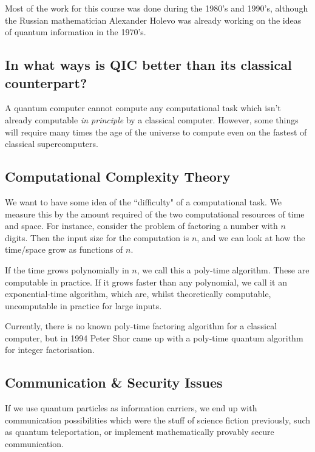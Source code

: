 \documentclass[10pt,a4paper]{article}
\begin{document}
Most of the work for this course was done during the 1980's and 1990's, although the Russian mathematician Alexander Holevo was already working on the ideas of quantum information in the 1970's.

\subsection*{In what ways is QIC better than its classical counterpart?}
A quantum computer cannot compute any computational task which isn't already computable \textit{in principle} by a classical computer. However, some things will require many times the age of the universe to compute even on the fastest of classical supercomputers.

\subsection{Computational Complexity Theory}
We want to have some idea of the ``difficulty" of a computational task. We measure this by the amount required of the two computational resources of time and space. For instance, consider the problem of factoring a number with $n$ digits. Then the input size for the computation is $n$, and we can look at how the time/space grow as functions of $n$.

If the time grows polynomially in $n$, we call this a poly-time algorithm. These are computable in practice. If it grows faster than any polynomial, we call it an exponential-time algorithm, which are, whilst theoretically computable, uncomputable in practice for large inputs. 

Currently, there is no known poly-time factoring algorithm for a classical computer, but in 1994 Peter Shor came up with a poly-time quantum algorithm for integer factorisation.

\subsection{Communication \& Security Issues}
If we use quantum particles as information carriers, we end up with communication possibilities which were the stuff of science fiction previously, such as quantum teleportation, or implement mathematically provably secure communication. 
\end{document}

